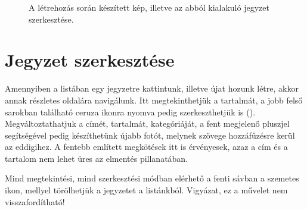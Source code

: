 \begin{figure}[!ht]
	\caption{A létrehozás során készített kép, illetve az abból kialakuló jegyzet szerkesztése.}
	\label{fig:NewNoteScreen}
\end{figure}
\newpage
\section{Jegyzet szerkesztése}
Amennyiben a listában egy jegyzetre kattintunk, illetve újat hozunk létre, akkor annak részletes oldalára navigálunk. Itt megtekinthetjük a tartalmát, a jobb felső sarokban található ceruza ikonra nyomva pedig szerkeszthetjük is (). Megváltoztathatjuk a címét, tartalmát, kategóriáját, a fent megjelenő pluszjel segítségével pedig készíthetünk újabb fotót, melynek szövege hozzáfűzésre kerül az eddigihez. A fentebb említett megkötések itt is érvényesek, azaz a cím és a tartalom nem lehet üres az elmentés pillanatában.

Mind megtekintési, mind szerkesztési módban elérhető a fenti sávban a szemetes ikon, mellyel törölhetjük a jegyzetet a listánkból. Vigyázat, ez a művelet nem visszafordítható!

